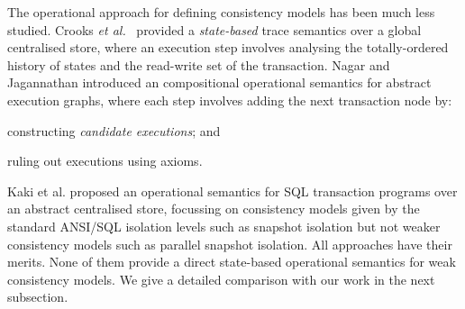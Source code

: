 The operational approach for defining consistency models has been much less studied. 
Crooks {\em et
  al.}~\citet{seebelieve} provided a \emph{state-based} trace
semantics over a global centralised store, where an execution step
involves analysing the totally-ordered history of states and the
read-write set of the transaction.
Nagar and Jagannathan \citet{sureshConcur} introduced an
compositional operational semantics for abstract execution graphs, 
where each
step involves adding the next transaction node by: \begin{enumerate*}
\item constructing \emph{candidate executions};  and 
\item ruling out executions using {axioms}. 
\end{enumerate*}
Kaki et al. \citet{alonetogether} proposed an
operational semantics for SQL transaction programs over an abstract
centralised store, focussing on consistency models given by the standard
ANSI/SQL isolation levels \cite{si} such as snapshot isolation but not
weaker consistency models such as parallel snapshot isolation. 
All approaches have their merits. None of them provide a direct
state-based operational semantics for weak consistency models. We give
a detailed comparison with our work in the next subsection.


